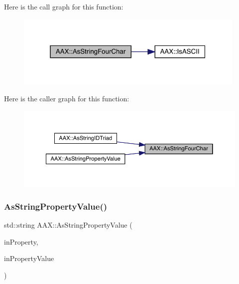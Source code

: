 Here is the call graph for this function\+:
\nopagebreak
\begin{figure}[H]
\begin{center}
\leavevmode
\includegraphics[width=313pt]{a00852_a22eda3cc42cb4ea2192b00bab7a69b02_cgraph}
\end{center}
\end{figure}
Here is the caller graph for this function\+:
\nopagebreak
\begin{figure}[H]
\begin{center}
\leavevmode
\includegraphics[width=350pt]{a00852_a22eda3cc42cb4ea2192b00bab7a69b02_icgraph}
\end{center}
\end{figure}
\mbox{\label{a00852_a1b3d4b5a967f01922963876447644b15}} 
\subsubsection{\texorpdfstring{AsStringPropertyValue()}{AsStringPropertyValue()}}
{\footnotesize\ttfamily std\+::string A\+A\+X\+::\+As\+String\+Property\+Value (\begin{DoxyParamCaption}\item[{\mbox{\hyperlink{a00662_a13e384f22825afd3db6d68395b79ce0d}{A\+A\+X\+\_\+\+E\+Property}}}]{in\+Property,  }\item[{\mbox{\hyperlink{a00392_ab247c0d8686c14e05cbb567ef276f249}{A\+A\+X\+\_\+\+C\+Property\+Value}}}]{in\+Property\+Value }\end{DoxyParamCaption})\hspace{0.3cm}{\ttfamily [inline]}}



